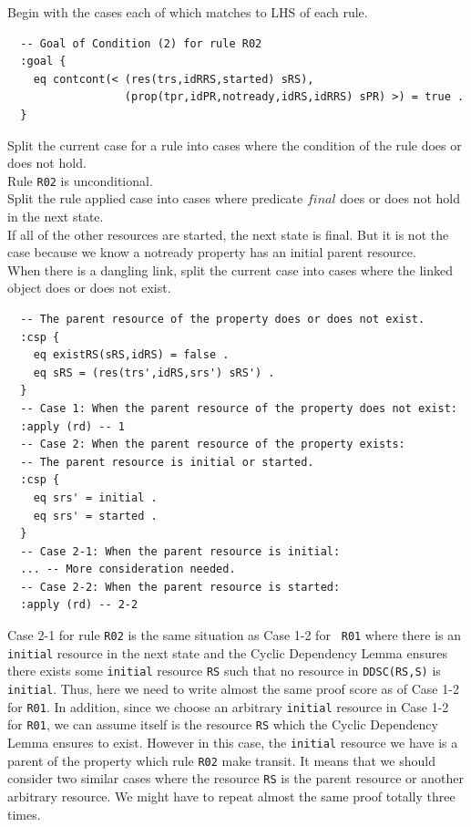 \documentclass[12pt]{report}
\newcommand{\stt}[1]{{\small{\tt {#1}}}}
\begin{document}
 Begin with the cases each of which matches to
LHS of each rule.
\small
\begin{verbatim}
  -- Goal of Condition (2) for rule R02
  :goal {
    eq contcont(< (res(trs,idRRS,started) sRS),
                  (prop(tpr,idPR,notready,idRS,idRRS) sPR) >) = true .
  }
\end{verbatim}
\normalsize
 Split the current case for a rule into
cases where the condition of the rule does or does not hold. \\
Rule {\tt R02} is unconditional.\\
 Split the rule applied case into cases where
predicate $final$ does or does not hold in the next state.\\
If all of the other resources are started, the next state is final.
But it is not the case because we know a notready property has
an initial parent resource. \\
 When there is a dangling link, split the
current case into cases where the linked object does or does not
exist.
\small
\begin{verbatim}
  -- The parent resource of the property does or does not exist.
  :csp {
    eq existRS(sRS,idRS) = false .
    eq sRS = (res(trs',idRS,srs') sRS') .
  }
  -- Case 1: When the parent resource of the property does not exist:
  :apply (rd) -- 1
  -- Case 2: When the parent resource of the property exists:
  -- The parent resource is initial or started.
  :csp {
    eq srs' = initial .
    eq srs' = started .
  }
  -- Case 2-1: When the parent resource is initial:
  ... -- More consideration needed.
  -- Case 2-2: When the parent resource is started:
  :apply (rd) -- 2-2
\end{verbatim}
\normalsize
Case 2-1 for rule {\tt R02} is the same situation as Case 1-2 for {\tt
  R01} where there is an {\tt initial} resource in the next state and
the Cyclic Dependency Lemma ensures there exists some {\tt initial}
resource {\tt RS} such that no resource in \stt{DDSC(RS,S)} is {\tt
  initial}. Thus, here we need to write almost the same proof score as
of Case 1-2 for {\tt R01}. In addition, since we choose an arbitrary
{\tt initial} resource in Case 1-2 for {\tt R01}, we can assume itself
is the resource {\tt RS} which the Cyclic Dependency Lemma ensures to
exist. However in this case, the {\tt initial} resource we have is
a parent of the property which rule {\tt R02} make transit. It means
that we should consider two similar cases where the resource {\tt RS}
is the parent resource or another arbitrary resource. We might have 
to repeat almost the same proof totally three times.
\end{document}
